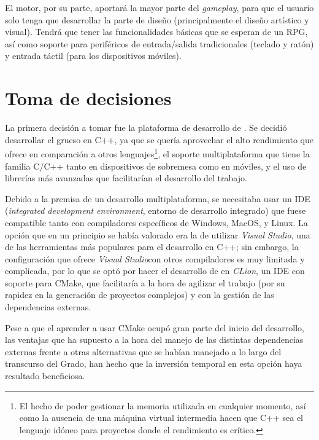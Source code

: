 \medskip

El motor, por su parte, aportará la mayor parte del \textit{gameplay}, para que el usuario solo tenga que desarrollar la parte de diseño (principalmente el diseño artístico y visual). Tendrá que tener las funcionalidades básicas que se esperan de un RPG, así como soporte para periféricos de entrada/salida tradicionales (teclado y ratón) y entrada táctil (para los dispositivos móviles). 

\section{Toma de decisiones}
\label{sec:decisiones}
La primera decisión a tomar fue la plataforma de desarrollo de \baker. Se decidió desarrollar el grueso en C++, ya que se quería aprovechar el alto rendimiento que ofrece en comparación a otros lenguajes\footnote{El hecho de poder gestionar la memoria utilizada en cualquier momento, así como la ausencia de una máquina virtual intermedia hacen que C++ sea el lenguaje idóneo para proyectos donde el rendimiento es crítico.}, el soporte multiplataforma que tiene la familia C/C++ tanto en dispositivos de sobremesa como en móviles, y el uso de librerías más avanzadas que facilitarían el desarrollo del trabajo.

\medskip

Debido a la premisa de un desarrollo multiplataforma, se necesitaba usar un IDE (\textit{integrated development environment}, entorno de desarrollo integrado) que fuese compatible tanto con compiladores específicos de Windows, MacOS, y Linux. La opción que en un principio se había valorado era la de utilizar \textit{Visual Studio}, una de las herramientas más populares para el desarrollo en C++; sin embargo, la configuración que ofrece \textit{Visual Studio}con otros compiladores es muy limitada y complicada, por lo que se optó por hacer el desarrollo de \baker{} en \textit{CLion}, un IDE con soporte para CMake, que facilitaría a la hora de agilizar el trabajo (por su rapidez en la generación de proyectos complejos) y con la gestión de las dependencias externas.

\smallskip

Pese a que el aprender a usar CMake ocupó gran parte del inicio del desarrollo, las ventajas que ha supuesto a la hora del manejo de las distintas dependencias externas frente a otras alternativas que se habían manejado a lo largo del transcurso del Grado, han hecho que la inversión temporal en esta opción haya resultado beneficiosa.

